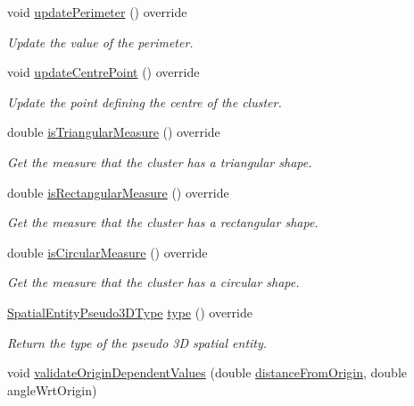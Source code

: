 \begin{DoxyCompactItemize}
void \hyperlink{classmultiscale_1_1analysis_1_1Cluster_aadc520e4459f1ea6e22afd7c02d5f2ed}{update\-Perimeter} () override
\begin{DoxyCompactList}\small\item\em Update the value of the perimeter. \end{DoxyCompactList}\item 
void \hyperlink{classmultiscale_1_1analysis_1_1Cluster_a1991d68cc9e76dab54c134df6beb59cb}{update\-Centre\-Point} () override
\begin{DoxyCompactList}\small\item\em Update the point defining the centre of the cluster. \end{DoxyCompactList}\item 
double \hyperlink{classmultiscale_1_1analysis_1_1Cluster_a28efcf050af76acb01619b36505b662e}{is\-Triangular\-Measure} () override
\begin{DoxyCompactList}\small\item\em Get the measure that the cluster has a triangular shape. \end{DoxyCompactList}\item 
double \hyperlink{classmultiscale_1_1analysis_1_1Cluster_aca93cb46704a3e824151e99b7a53d20d}{is\-Rectangular\-Measure} () override
\begin{DoxyCompactList}\small\item\em Get the measure that the cluster has a rectangular shape. \end{DoxyCompactList}\item 
double \hyperlink{classmultiscale_1_1analysis_1_1Cluster_a579730478055ae93d659f268375a492d}{is\-Circular\-Measure} () override
\begin{DoxyCompactList}\small\item\em Get the measure that the cluster has a circular shape. \end{DoxyCompactList}\item 
\hyperlink{namespacemultiscale_1_1analysis_a6db9cbf10615e77e300c3e4cb1c56660}{Spatial\-Entity\-Pseudo3\-D\-Type} \hyperlink{classmultiscale_1_1analysis_1_1Cluster_a0a4531d371662e9c4149c10aa115fb49}{type} () override
\begin{DoxyCompactList}\small\item\em Return the type of the pseudo 3\-D spatial entity. \end{DoxyCompactList}\item 
void \hyperlink{classmultiscale_1_1analysis_1_1Cluster_a26b9c11e63bfdbfc837a35f68c5c40dd}{validate\-Origin\-Dependent\-Values} (double \hyperlink{classmultiscale_1_1analysis_1_1SpatialEntityPseudo3D_a056f67b90ed41c0e6dc4df31b71ad906}{distance\-From\-Origin}, double angle\-Wrt\-Origin)

\end{DoxyCompactItemize}
